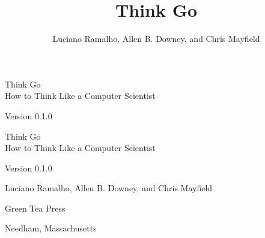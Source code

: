 \documentclass[12pt]{book}
\title{Think Go}
\author{Luciano Ramalho, Allen B. Downey, and Chris Mayfield}
\newcommand{\thetitle}{Think Go}
\newcommand{\thesubtitle}{How to Think Like a Computer Scientist}
\newcommand{\theauthors}{Luciano Ramalho, Allen B. Downey, and Chris Mayfield}
\newcommand{\theversion}{0.1.0}
\theoremstyle{exercise}
\newif\ifplastex
\begin{document}
\frontmatter

\ifplastex

\maketitle

\else

\begin{latexonly}

\thispagestyle{empty}

\begin{flushright}
\vspace*{2.0in}

\begin{spacing}{3}
{\huge \thetitle} \\
{\Large \thesubtitle}
\end{spacing}

\vspace{0.25in}

Version \theversion

\vfill
\end{flushright}

\newpage
\thispagestyle{empty}

\quad

\newpage
\thispagestyle{empty}

\begin{flushright}
\vspace*{2.0in}

\begin{spacing}{3}
{\huge \thetitle} \\
{\Large \thesubtitle}
\end{spacing}

\vspace{0.25in}

Version \theversion

\vspace{1in}

{\Large \theauthors}

\vspace{0.5in}

{\Large Green Tea Press}

{\small Needham, Massachusetts}

\vfill
\end{flushright}


\end{latexonly}
\end{document}
